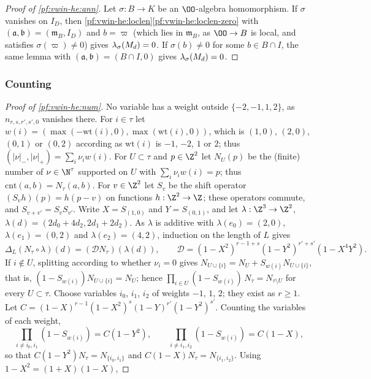 \begin{proof}[Proof of \cref{pf:vwin-he:ann}]
Let $\sigma:B\to K$ be an $\OO$-algebra homomorphism. If $\sigma$ vanishes on $I_D$, then
\cref{pf:vwin-he:loclen}\ref{pf:vwin-he:loclen-zero} with $(\mathfrak a,\mathfrak b)=(\mathfrak m_B,I_D)$ and $b=\varpi$
(which lies in $\mathfrak m_B$, as $\OO\to B$ is local, and satisfies $\sigma(\varpi)\ne0$) gives
$\lambda_\sigma(M_d)=0$. If $\sigma(b)\ne0$ for some $b\in B\cap I$, the same lemma with
$(\mathfrak a,\mathfrak b)=(B\cap I,0)$ gives $\lambda_\sigma(M_d)=0$.
\end{proof}

\subsubsection{Counting}\label{sec:pf:vwin-he:pf-count}

\begin{proof}[Proof of \cref{pf:vwin-he:num}]
No variable has a weight outside $\{-2,-1,1,2\}$, as $n_{r,s,r',s',0}$ vanishes there. For $i\in\tau$ let
$w(i)=(\max(-\mathrm{wt}(i),0),\max(\mathrm{wt}(i),0))$, which is $(1,0)$, $(2,0)$, $(0,1)$ or $(0,2)$ according as
$\mathrm{wt}(i)$ is $-1$, $-2$, $1$ or $2$; thus $(|\nu|_-,|\nu|_+)=\sum_i\nu_iw(i)$. For $U\subset\tau$ and $p\in\Z^2$
let $N_U(p)$ be the (finite) number of $\nu\in\N^\tau$ supported on $U$ with $\sum_i\nu_iw(i)=p$; thus
$\mathrm{cnt}(a,b)=N_\tau(a,b)$. For $v\in\Z^2$ let $S_v$ be the shift operator $(S_vh)(p)=h(p-v)$ on functions
$h:\Z^2\to\Z$; these operators commute, and $S_{v+v'}=S_vS_{v'}$. Write $X=S_{(1,0)}$ and $Y=S_{(0,1)}$, and let
$\lambda:\Z^3\to\Z^2$, $\lambda(d)=(2d_0+4d_2,2d_1+2d_2)$. As $\lambda$ is additive with $\lambda(e_0)=(2,0)$,
$\lambda(e_1)=(0,2)$ and $\lambda(e_2)=(4,2)$, induction on the length of $L$ gives
\begin{equation}\label{pf:vwin-he:eq-num1}
 \Delta_L(N_\tau\circ\lambda)(d)=(\mathcal DN_\tau)(\lambda(d)),\qquad
 \mathcal D=(1-X^2)^{r-1+s}(1-Y^2)^{r'+s'}(1-X^4Y^2).
\end{equation}
If $i\notin U$, splitting according to whether $\nu_i=0$ gives $N_{U\cup\{i\}}=N_U+S_{w(i)}N_{U\cup\{i\}}$, that is,
$(1-S_{w(i)})N_{U\cup\{i\}}=N_U$; hence $\prod_{i\in U}(1-S_{w(i)})\,N_\tau=N_{\tau\setminus U}$ for every
$U\subset\tau$. Choose variables $i_0$, $i_1$, $i_2$ of weights $-1$, $1$, $2$; they exist as $r\ge1$. Let
$C=(1-X)^{r-1}(1-X^2)^s(1-Y)^{r'}(1-Y^2)^{s'}$. Counting the variables of each weight,
\[
 \prod_{i\ne i_0,i_1}(1-S_{w(i)})=C(1-Y^2),\qquad\prod_{i\ne i_1,i_2}(1-S_{w(i)})=C(1-X),
\]
so that $C(1-Y^2)N_\tau=N_{\{i_0,i_1\}}$ and $C(1-X)N_\tau=N_{\{i_1,i_2\}}$. Using $1-X^2=(1+X)(1-X)$,

\end{proof}
